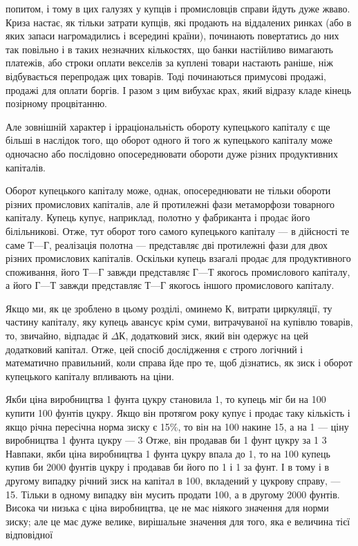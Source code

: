 \parcont{}  %
попитом, і тому в цих галузях у купців і промисловців справи
йдуть дуже жваво. Криза настає, як тільки затрати купців, які
продають на віддалених ринках (або в яких запаси нагромадились
і всередині країни), починають повертатись до них так
повільно і в таких незначних кількостях, що банки настійливо
вимагають платежів, або строки оплати векселів за куплені
товари настають раніше, ніж відбувається перепродаж цих
товарів. Тоді починаються примусові продажі, продажі для
оплати боргів. І разом з цим вибухає крах, який відразу кладе
кінець позірному процвітанню.

Але зовнішній характер і ірраціональність обороту купецького
капіталу є ще більші в наслідок того, що оборот одного й того ж
купецького капіталу може одночасно або послідовно опосереднювати
обороти дуже різних продуктивних капіталів.

Оборот купецького капіталу може, однак, опосереднювати
не тільки обороти різних промислових капіталів, але й протилежні
фази метаморфози товарного капіталу. Купець купує,
наприклад, полотно у фабриканта і продає його білільникові.
Отже, тут оборот того самого купецького капіталу — в дійсності
те саме $Т — Г$, реалізація полотна — представляє дві протилежні
фази для двох різних промислових капіталів. Оскільки
купець взагалі продає для продуктивного споживання, його
$Т — Г$ завжди представляє $Г — Т$ якогось промислового капіталу,
а його $Г — Т$ завжди представляє $Т — Г$ якогось іншого промислового
капіталу.

Якщо ми, як це зроблено в цьому розділі, оминемо $К$, витрати
циркуляції, ту частину капіталу, яку купець авансує крім
суми, витрачуваної на купівлю товарів, то, звичайно, відпадає
й $ΔК$, додатковий зиск, який він одержує на цей додатковий
капітал. Отже, цей спосіб дослідження є строго логічний і математично
правильний, коли справа йде про те, щоб дізнатись,
як зиск і оборот купецького капіталу впливають на ціни.

Якби ціна виробництва 1 фунта цукру становила 1, то купець міг би на 100 купити
100 фунтів цукру. Якщо він протягом року купує і продає таку
кількість і якщо річна пересічна норма зиску є 15\%, то він
на 100 накине 15, а на
1 — ціну виробництва 1 фунта цукру — 3
Отже, він продавав би 1 фунт цукру за 1 3
Навпаки, якби ціна виробництва 1 фунта цукру впала до
1, то на 100 купець купив би 2000 фунтів
цукру і продавав би його по 1 і 1 за фунт.
І в тому і в другому випадку річний зиск на капітал в 100, вкладений у цукрову справу, — 15.
Тільки в одному випадку він мусить продати 100, а в другому
2000 фунтів. Висока чи низька є ціна виробництва, це не має
ніякого значення для норми зиску; але це має дуже велике,
вирішальне значення для того, яка е величина тієї відповідної
\parbreak{}  %
